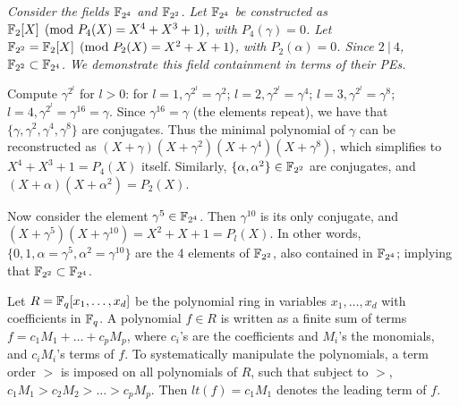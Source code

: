\begin{Example}
{\it
Consider the fields ${\mathbb{F}}_{2^4}$ and ${\mathbb{F}}_{2^2}$. Let ${\mathbb{F}}_{2^4}$ be
constructed as ${\mathbb{F}}_2[X] \pmod{ P_4(X)=X^4+X^3+1}$, with $P_4(\gamma)=0$. 
Let ${\mathbb{F}}_{2^2} = {\mathbb{F}}_2[X]\pmod{
  P_2(X)=X^2+X+1}$, with $P_2(\alpha)=0$. Since $2 ~|~ 4$, ${\mathbb{F}}_{2^2}
\subset {\mathbb{F}}_{2^4}$. We demonstrate this field containment in terms of
their PEs. 

Compute $\gamma^{2^l}$ for $l>0$: for
$l=1,\gamma^{2^l}=\gamma^2$; $l=2, \gamma^{2^l}=\gamma^4$; $l=3,
\gamma^{2^l}=\gamma^8$; $l=4, \gamma^{2^l}=\gamma^{16}=\gamma$. Since
$\gamma^{16}=\gamma$ (the elements repeat), we have that $\{\gamma,
\gamma^2, \gamma^4, \gamma^8\}$ are conjugates. Thus the minimal
polynomial of $\gamma$ can be reconstructed as
$(X+\gamma)(X+\gamma^2)(X+\gamma^4)(X+\gamma^8)$, which simplifies to
$X^4+X^3+1 = P_4(X)$
itself. Similarly, $\{\alpha,\alpha^2\}\in {\mathbb{F}}_{2^2}$ are conjugates, and
$(X+\alpha)(X+\alpha^2)=P_2(X)$.

Now consider the element $\gamma^5 \in {\mathbb{F}}_{2^4}$. Then $\gamma^{10}$
is its only conjugate, and $(X+\gamma^5)(X+\gamma^{10}) =
X^2+X+1=P_l(X)$. In other words, $\{0, 1, \alpha = \gamma^5, \alpha^2 =
\gamma^{10}\}$ are the 4 elements of ${\mathbb{F}}_{2^2}$, also contained in
${\mathbb{F}}_{2^4}$; implying that ${\mathbb{F}}_{2^2} \subset {\mathbb{F}}_{2^4}$.
}
\end{Example}

Let $R={\mathbb{F}}_q[x_1,\dots,x_d]$ be the  polynomial ring in variables
$x_1,\dots,x_d$ with coefficients in ${\mathbb{F}}_q$. A polynomial $f \in R$ is 
written as a finite sum of terms  $f = c_1 M_1 +  \dots +
c_p M_p$, where $c_i$'s are the coefficients and $M_i$'s
the monomials, and $c_i M_i$'s terms of $f$.
To systematically manipulate the polynomials, a term order $>$
is imposed on all polynomials of $R$, such that subject to $>$,
$c_1M_1 > c_2 M_2 > \dots > c_p M_p$. Then $lt(f) = c_1 M_1$ denotes
the leading term of $f$. 


